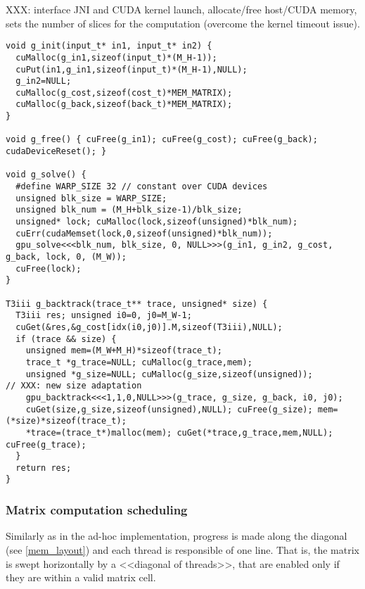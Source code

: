 XXX: interface JNI and CUDA kernel launch, allocate/free host/CUDA memory, sets the number of slices for the computation (overcome the kernel timeout issue).

\begin{verbatim}
void g_init(input_t* in1, input_t* in2) {
  cuMalloc(g_in1,sizeof(input_t)*(M_H-1));
  cuPut(in1,g_in1,sizeof(input_t)*(M_H-1),NULL);
  g_in2=NULL;
  cuMalloc(g_cost,sizeof(cost_t)*MEM_MATRIX);
  cuMalloc(g_back,sizeof(back_t)*MEM_MATRIX);
}

void g_free() { cuFree(g_in1); cuFree(g_cost); cuFree(g_back); cudaDeviceReset(); }

void g_solve() {
  #define WARP_SIZE 32 // constant over CUDA devices
  unsigned blk_size = WARP_SIZE;
  unsigned blk_num = (M_H+blk_size-1)/blk_size;
  unsigned* lock; cuMalloc(lock,sizeof(unsigned)*blk_num);
  cuErr(cudaMemset(lock,0,sizeof(unsigned)*blk_num));
  gpu_solve<<<blk_num, blk_size, 0, NULL>>>(g_in1, g_in2, g_cost, g_back, lock, 0, (M_W));
  cuFree(lock);
}

T3iii g_backtrack(trace_t** trace, unsigned* size) {
  T3iii res; unsigned i0=0, j0=M_W-1;
  cuGet(&res,&g_cost[idx(i0,j0)].M,sizeof(T3iii),NULL);
  if (trace && size) {
    unsigned mem=(M_W+M_H)*sizeof(trace_t);
    trace_t *g_trace=NULL; cuMalloc(g_trace,mem);
    unsigned *g_size=NULL; cuMalloc(g_size,sizeof(unsigned));
// XXX: new size adaptation
    gpu_backtrack<<<1,1,0,NULL>>>(g_trace, g_size, g_back, i0, j0);
    cuGet(size,g_size,sizeof(unsigned),NULL); cuFree(g_size); mem=(*size)*sizeof(trace_t);
    *trace=(trace_t*)malloc(mem); cuGet(*trace,g_trace,mem,NULL); cuFree(g_trace);
  }
  return res;
}
\end{verbatim}

\subsubsection{Matrix computation scheduling}
Similarly as in the ad-hoc implementation, progress is made along the diagonal (see \ref{mem_layout}) and each thread is responsible of one line. That is, the matrix is swept horizontally by a <<diagonal of threads>>, that are enabled only if they are within a valid matrix cell.

